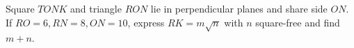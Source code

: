 Square $TONK$ and triangle $RON$ lie in perpendicular planes and share side $ON$. If $RO=6,RN=8,ON=10$, express $RK=m\sqrt n$ with $n$ square-free and find $m+n$.
